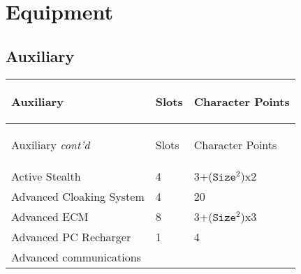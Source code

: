 \documentclass[twoside]{book}
\begin{document}
    

\section{Equipment}
    
    

\subsection{Auxiliary}
    
\begin{longtable}{p{1.25in}ll} 
  Auxiliary
  &
  \begin{turn}{70}{Slots}\end{turn}
          
  &
  \begin{turn}{70}{Character Points}\end{turn}
          
  \\
  \hline
  \hline
  \endfirsthead
  Auxiliary \textit{cont'd}
        
  &
  \begin{turn}{70}{Slots}\end{turn}
          
  &
  \begin{turn}{70}{Character Points}\end{turn}
          
  \\
  \hline
  \endhead
      
  \raggedright
           Active Stealth 
  &
   4 
  &
   3+(\begin{math}{\texttt{Size}}^{2}\end{math})x2
           
  \tabularnewline
      
  \raggedright
           Advanced Cloaking System
           
  &
   4 
  &
   20 
  \tabularnewline
      
  \raggedright
           Advanced ECM 
  &
   8 
  &
   3+(\begin{math}{\texttt{Size}}^{2}\end{math})x3
           
  \tabularnewline
      
  \raggedright
           Advanced PC Recharger 
  &
   1 
  &
   4 
  \tabularnewline
      
  \raggedright
           Advanced communications
           

\end{longtable}
\end{document}
